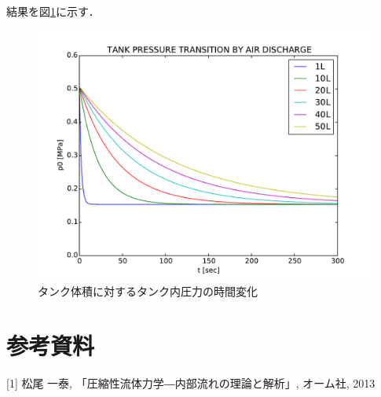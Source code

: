 \documentclass{jsarticle}
\begin{document}
結果を図\ref{fig:result}に示す．
\begin{figure}[htbp]
 \centering
 \includegraphics[width=150mm]{result.pdf}
 \caption{タンク体積に対するタンク内圧力の時間変化}
 \label{fig:result}
\end{figure}


\section{参考資料}
[1] 松尾 一泰, 「圧縮性流体力学―内部流れの理論と解析」, オーム社, 2013
\end{document}
